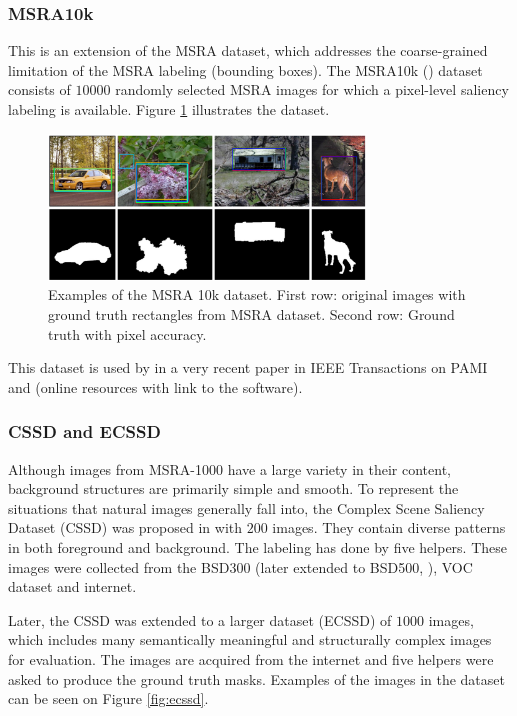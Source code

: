 \subsubsection{MSRA10k}
This is an extension of the MSRA dataset, which  addresses the coarse-grained limitation of the MSRA labeling (bounding boxes). The MSRA10k (\cite{msra10k_db}) dataset consists of $10000$ randomly selected MSRA images for which a pixel-level saliency labeling is available. Figure \ref{fig:msra10k} illustrates the dataset. 
\begin{figure}[H]
\begin{center}
\includegraphics[width=0.75\textwidth]{fig/MSRA10k}
\end{center}
\caption{Examples of the MSRA 10k dataset. First row: original images with ground truth rectangles from MSRA dataset. Second row: Ground truth with pixel accuracy.}
\label{fig:msra10k}
\end{figure}
This dataset is used by in a very recent paper in IEEE Transactions on PAMI \cite{ChengPAMI2015} and \cite{chengPAMIUrl} (online resources with link to the software). 

\subsubsection{CSSD and ECSSD}\label{subsec:cssd}
Although images from MSRA-1000 \cite{LCAV-CONF-2009-012} have a large variety in their content, background structures are primarily simple and smooth. To represent the situations that natural images generally fall into, the Complex Scene Saliency Dataset (CSSD) \cite{cssd_db} was proposed in \cite{YanCVPR2013} with $200$ images. They contain diverse patterns in both foreground and background. The labeling has done by five  helpers. These images were collected from the BSD300 (later extended to BSD500, \cite{bsd300/500_db}), VOC dataset \cite{voc_db} and internet.

Later, the CSSD was extended to a larger dataset (ECSSD) of $1000$ images, which includes many semantically meaningful and structurally complex images for evaluation. The images are acquired from the internet and five helpers were asked to produce the ground truth masks. Examples of the images in the dataset can be seen on Figure \ref{fig:ecssd}.

